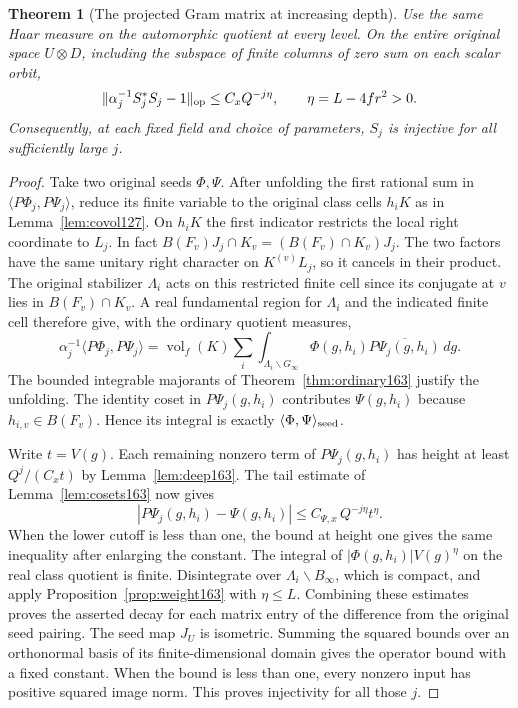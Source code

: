 \documentclass[a4paper,11pt]{article}
\newtheorem{theorem}[proposition]{Theorem}
\theoremstyle{definition}
\theoremstyle{remark}
\numberwithin{equation}{section}
\begin{document}
\begin{theorem}[The projected Gram matrix at increasing depth]
\label{thm:deep163}
Use the same Haar measure on the automorphic quotient at every
level. On the entire original space \(U\otimes D\), including
the subspace of finite columns of zero sum on each scalar orbit,
\[
             \|\alpha_j^{-1}S_j^*S_j-1\|_{\rm op}
                         \le C_x Q^{-j\eta},\qquad
                         \eta=L-4fr^2>0 .
\]
Consequently, at each fixed field and choice of parameters,
\(S_j\) is injective for all sufficiently large \(j\).
\end{theorem}
\begin{proof}
Take two original seeds \(\Phi,\Psi\). After unfolding the
first rational sum in \(\langle P\Phi_j,P\Psi_j\rangle\),
reduce its finite variable to the original class cells \(h_iK\)
as in Lemma~\ref{lem:covol127}. On \(h_iK\) the first indicator
restricts the local right coordinate to \(L_j\). In fact
\(B(F_v)J_j\cap K_v=(B(F_v)\cap K_v)J_j\).
The two factors have the same unitary right character on
\(K^{(v)}L_j\), so it cancels in their product. The original
stabilizer \(\Lambda_i\) acts on this restricted finite cell
since its conjugate at \(v\) lies in \(B(F_v)\cap K_v\).
A real fundamental region for \(\Lambda_i\) and the indicated
finite cell therefore give, with the ordinary quotient measures,
\[
 \alpha_j^{-1}\langle P\Phi_j,P\Psi_j\rangle
 =\operatorname{vol}_f(K)\sum_i
    \int_{\Lambda_i\backslash G_\infty}
       \Phi(g,h_i)\overline{P\Psi_j(g,h_i)}\,dg .
\]
The bounded integrable majorants of
Theorem~\ref{thm:ordinary163} justify the unfolding. The
identity coset in \(P\Psi_j(g,h_i)\) contributes \(\Psi(g,h_i)\)
because \(h_{i,v}\in B(F_v)\). Hence its integral is exactly
\(\langle\Phi,\Psi\rangle_{\rm seed}\).

Write \(t=V(g)\). Each remaining nonzero term of \(P\Psi_j(g,h_i)\)
has height at least \(Q^j/(C_x t)\) by Lemma~\ref{lem:deep163}.
The tail estimate of Lemma~\ref{lem:cosets163} now gives
\[
 |P\Psi_j(g,h_i)-\Psi(g,h_i)|
       \le C_{\Psi,x}\,Q^{-j\eta}t^\eta .
\]
When the lower cutoff is less than one, the bound at height
one gives the same inequality after enlarging the constant.
The integral of \(|\Phi(g,h_i)|V(g)^\eta\) on the real class
quotient is finite. Disintegrate over
\(\Lambda_i\backslash B_\infty\), which is compact, and apply
Proposition~\ref{prop:weight163} with \(\eta\le L\).
Combining these estimates proves the asserted decay for each
matrix entry of the difference from the original seed pairing.
The seed map \(J_U\) is isometric. Summing the squared bounds
over an orthonormal basis of its finite-dimensional domain gives
the operator bound with a fixed constant. When the bound is
less than one, every nonzero input has positive squared image
norm. This proves injectivity for all those \(j\).
\end{proof}
\end{document}
